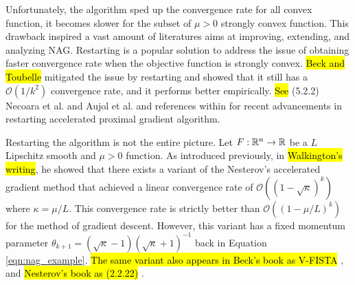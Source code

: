 \documentclass[12pt]{article}
\begin{document}
    Unfortunately, the algorithm sped up the convergence rate for all convex function, it becomes slower for the subset of $\mu > 0$ strongly convex function. 
    This drawback inspired a vast amount of literatures aims at improving, extending, and analyzing NAG. 
    Restarting is a popular solution to address the issue of obtaining faster convergence rate when the objective function is strongly convex. 
    {\hl{Beck and Toubelle}} \cite{beck_fast_2009}
    mitigated the issue by restarting and showed that it still has a $\mathcal O(1/k^2)$ convergence rate, and it performs better empirically. 
    {\hl{See} (5.2.2) Necoara et al. \cite{necoara_linear_2019} and Aujol et al. \cite{aujol_parameter-free_2024}}
    and references within for recent advancements in restarting accelerated proximal gradient algorithm.
    \par
    Restarting the algorithm is not the entire picture. 
    Let $F:\mathbb R^n \rightarrow \mathbb R$ be a $L$ Lipschitz smooth and $\mu > 0$ function. 
    As introduced previously, in 
    {\hl{Walkington's writing}}, 
    he showed that there exists a variant of the Nesterov's accelerated gradient method that achieved a linear convergence rate of $\mathcal O((1 - \sqrt{\kappa})^k)$ where $\kappa = \mu/L$. 
    This convergence rate is strictly better than $\mathcal O((1 - \mu/L)^k)$ for the method of gradient descent. 
    However, this variant has a fixed momentum parameter $\theta_{k + 1} = (\sqrt{\kappa} - 1)(\sqrt{\kappa} + 1)^{-1}$ back in Equation \ref{eqn:nag_example}. 
    {\hl{
        The same variant also appears in Beck's book as V-FISTA} \cite{beck_first-order_2017}, and \hl{Nesterov's book as (2.2.22)} \cite{nesterov_lectures_2018}.
    }
\end{document}
